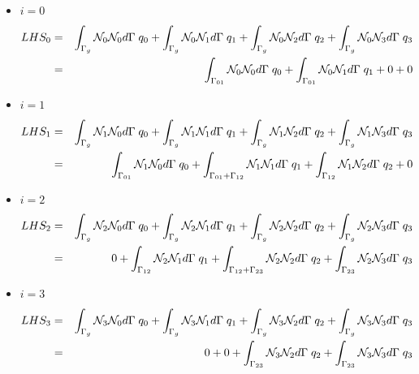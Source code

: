 \begin{itemize}
\item $i=0$
\begin{eqnarray}
LHS_0
&=&
\int_{\Gamma_g} {\mathcal{N}}_0 {\mathcal{N}}_0 d\Gamma \; q_0 +
\int_{\Gamma_g} {\mathcal{N}}_0 {\mathcal{N}}_1 d\Gamma \; q_1 +
\int_{\Gamma_g} {\mathcal{N}}_0 {\mathcal{N}}_2 d\Gamma \; q_2 +
\int_{\Gamma_g} {\mathcal{N}}_0 {\mathcal{N}}_3 d\Gamma \; q_3 \nonumber\\
&=&
\int_{\Gamma_{01}} {\mathcal{N}}_0 {\mathcal{N}}_0 d\Gamma \; q_0 +
\int_{\Gamma_{01}} {\mathcal{N}}_0 {\mathcal{N}}_1 d\Gamma \; q_1 +
0 +
0 \nonumber
\end{eqnarray}



\item $i=1$
\begin{eqnarray}
LHS_1
&=&
\int_{\Gamma_g} {\mathcal{N}}_1 {\mathcal{N}}_0 d\Gamma \; q_0 +
\int_{\Gamma_g} {\mathcal{N}}_1 {\mathcal{N}}_1 d\Gamma \; q_1 +
\int_{\Gamma_g} {\mathcal{N}}_1 {\mathcal{N}}_2 d\Gamma \; q_2 +
\int_{\Gamma_g} {\mathcal{N}}_1 {\mathcal{N}}_3 d\Gamma \; q_3 \nonumber\\
&=&
\int_{\Gamma_{01}} {\mathcal{N}}_1 {\mathcal{N}}_0 d\Gamma \; q_0 +
\int_{\Gamma_{01}+\Gamma_{12}} {\mathcal{N}}_1 {\mathcal{N}}_1 d\Gamma \; q_1 +
\int_{\Gamma_{12}} {\mathcal{N}}_1 {\mathcal{N}}_2 d\Gamma \; q_2 +
0 \nonumber
\end{eqnarray}

\item $i=2$
\begin{eqnarray}
LHS_2
&=&
\int_{\Gamma_g} {\mathcal{N}}_2 {\mathcal{N}}_0 d\Gamma \; q_0 +
\int_{\Gamma_g} {\mathcal{N}}_2 {\mathcal{N}}_1 d\Gamma \; q_1 +
\int_{\Gamma_g} {\mathcal{N}}_2 {\mathcal{N}}_2 d\Gamma \; q_2 +
\int_{\Gamma_g} {\mathcal{N}}_2 {\mathcal{N}}_3 d\Gamma \; q_3 \nonumber\\
&=&
0+
\int_{\Gamma_{12}} {\mathcal{N}}_2 {\mathcal{N}}_1 d\Gamma \; q_1 +
\int_{\Gamma_{12}+\Gamma_{23}} {\mathcal{N}}_2 {\mathcal{N}}_2 d\Gamma \; q_2 +
\int_{\Gamma_{23}} {\mathcal{N}}_2 {\mathcal{N}}_3 d\Gamma \; q_3 \nonumber
\end{eqnarray}



\item $i=3$
\begin{eqnarray}
LHS_3
&=&
\int_{\Gamma_g} {\mathcal{N}}_3 {\mathcal{N}}_0 d\Gamma \; q_0 +
\int_{\Gamma_g} {\mathcal{N}}_3 {\mathcal{N}}_1 d\Gamma \; q_1 +
\int_{\Gamma_g} {\mathcal{N}}_3 {\mathcal{N}}_2 d\Gamma \; q_2 +
\int_{\Gamma_g} {\mathcal{N}}_3 {\mathcal{N}}_3 d\Gamma \; q_3 \nonumber\\
&=&
0 +
0 +
\int_{\Gamma_{23}} {\mathcal{N}}_3 {\mathcal{N}}_2 d\Gamma \; q_2 +
\int_{\Gamma_{23}} {\mathcal{N}}_3 {\mathcal{N}}_3 d\Gamma \; q_3 \nonumber
\end{eqnarray}

\end{itemize}


